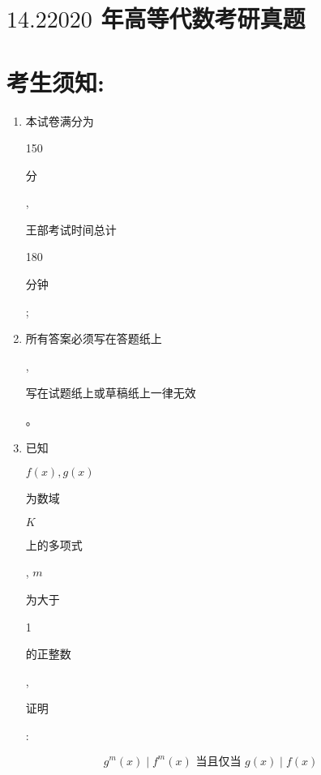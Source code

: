 \documentclass[10pt]{article}
\begin{document}
\section{$14.22020$ 年高等代数考研真题}
\section{考生须知:}
\begin{enumerate}
  \item \begin{CJK}{UTF8}{mj}本试卷满分为\end{CJK} 150 \begin{CJK}{UTF8}{mj}分\end{CJK}, \begin{CJK}{UTF8}{mj}王部考试时间总计\end{CJK} 180 \begin{CJK}{UTF8}{mj}分钟\end{CJK};

  \item \begin{CJK}{UTF8}{mj}所有答案必须写在答题纸上\end{CJK}, \begin{CJK}{UTF8}{mj}写在试题纸上或草稿纸上一律无效\end{CJK}。

  \item \begin{CJK}{UTF8}{mj}已知\end{CJK} $f(x), g(x)$ \begin{CJK}{UTF8}{mj}为数域\end{CJK} $K$ \begin{CJK}{UTF8}{mj}上的多项式\end{CJK}, $m$ \begin{CJK}{UTF8}{mj}为大于\end{CJK} 1 \begin{CJK}{UTF8}{mj}的正整数\end{CJK}, \begin{CJK}{UTF8}{mj}证明\end{CJK}:

\end{enumerate}
$$
g^{m}(x) \mid f^{m}(x) \text { 当且仅当 } g(x) \mid f(x)
$$
\end{document}
